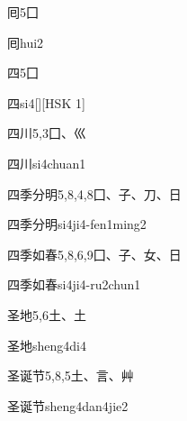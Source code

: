 \begin{entry}{囘}{5}{⼞}
  \begin{phonetics}{囘}{hui2}
  \end{phonetics}
\end{entry}

\begin{entry}{四}{5}{⼞}
  \begin{phonetics}{四}{si4}[][HSK 1]
  \end{phonetics}
\end{entry}

\begin{entry}{四川}{5,3}{⼞、⼮}
  \begin{phonetics}{四川}{si4chuan1}
  \end{phonetics}
\end{entry}

\begin{entry}{四季分明}{5,8,4,8}{⼞、⼦、⼑、⽇}
  \begin{phonetics}{四季分明}{si4ji4-fen1ming2}
  \end{phonetics}
\end{entry}

\begin{entry}{四季如春}{5,8,6,9}{⼞、⼦、⼥、⽇}
  \begin{phonetics}{四季如春}{si4ji4-ru2chun1}
  \end{phonetics}
\end{entry}

\begin{entry}{圣地}{5,6}{⼟、⼟}
  \begin{phonetics}{圣地}{sheng4di4}
  \end{phonetics}
\end{entry}

\begin{entry}{圣诞节}{5,8,5}{⼟、⾔、⾋}
  \begin{phonetics}{圣诞节}{sheng4dan4jie2}
  \end{phonetics}
\end{entry}

